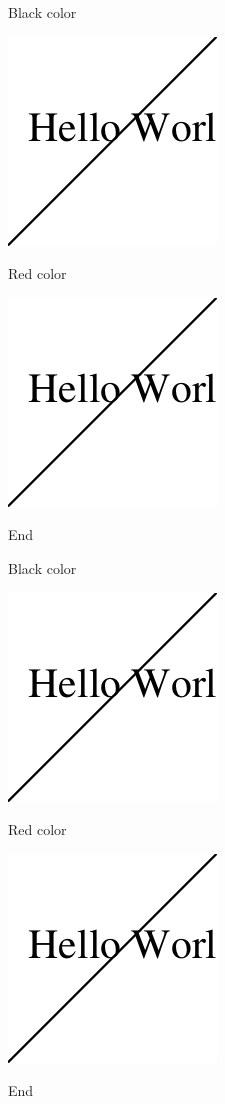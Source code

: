 \documentclass[a4paper,12pt]{article}
\begin{document}
\color{black}
Black color

\includegraphics{stroke}

\color{red}
Red color

\includegraphics{stroke}

End

\newpage

\color{black}
Black color

\includegraphics{stroke}

\color{red}
Red color

\includegraphics{stroke}

End
\end{document}
